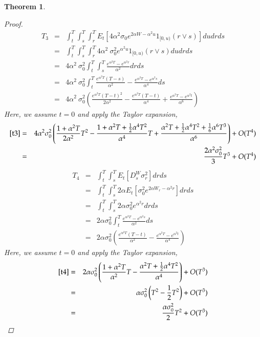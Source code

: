 \documentclass[11pt]{article}
\newtheorem{theorem}{Theorem}
\begin{document}
\begin{theorem}
\begin{proof}
\begin{eqnarray}
T_3 
&=& \int_{t}^{T} \int_{s}^{T}\int_{r}^{T} E_{t}\left[ 4 \alpha^2\sigma_0 e^{2\alpha W - \alpha^2 u}1_{[0,u)}(r \vee s)\right]du dr ds\nonumber\\
&=& \int_{t}^{T} \int_{s}^{T}\int_{r}^{T} 4 \alpha^2\ \sigma_0^2 e^{\alpha^2 u}1_{[0,u)}(r \vee s)du dr ds\nonumber\\
&=& 4 \alpha^2\ \sigma_0^2 \int_{t}^{T} \int_{s}^{T} \frac{e^{\alpha^2 T} - e^{\alpha^2 r}}{\alpha^2} dr ds\nonumber\\
&=& 4 \alpha^2\ \sigma_0^2 \int_{t}^{T} \frac{e^{\alpha^2 T}(T-s)}{\alpha^2} - \frac{e^{\alpha^2 T} - e^{\alpha^2 s}}{\alpha^4} ds\nonumber\\
&=& 4 \alpha^2\ \sigma_0^2 \left( \frac{e^{\alpha^2 T}(T-t)^2}{2\alpha^2} - \frac{e^{\alpha^2 T}(T-t)}{\alpha^4} + \frac{e^{\alpha^2 T} - e^{\alpha^2 t}}{\alpha^6} \right)\label{t3}
\end{eqnarray}
Here, we assume $t=0$ and apply the Taylor expansion,
\begin{eqnarray}
\eqref{t3}
&=& 
4\alpha^2 \sigma_0^2  \left(\frac{1+\alpha^2T}{2\alpha^2}T^2 - \frac{1+\alpha^2T + \frac{1}{2}\alpha^4T^2}{\alpha^4}T + \frac{\alpha^2T + \frac{1}{2}\alpha^4T^2 + \frac{1}{6}\alpha^6T^3}{\alpha^6}\right)+O(T^4)\nonumber\\
&=& 
\frac{2 \alpha^2\sigma_0^2}{3}T^3+O(T^4)
\end{eqnarray}
\begin{eqnarray}
T_4
&=& 
\int_{t}^{T}\int_{s}^{T}E_{t}\left[D_{s}^{W}\sigma _{r}^{2}\right] dr ds \nonumber\\
&=&
\int_{t}^{T}\int_{s}^{T}2\alpha E_{t}\left[ \sigma_0^2 e^{2\alpha W_r - \alpha^2 r}\right] dr ds \nonumber\\
&=&
\int_{t}^{T}\int_{s}^{T}2\alpha \sigma_0^2 e^{\alpha^2 r} dr ds \nonumber\\
&=&
2\alpha \sigma_0^2 \int_{t}^{T} \frac{e^{\alpha^2 T} - e^{\alpha^2 s}}{\alpha^2} ds \nonumber\\
&=&
2\alpha \sigma_0^2  \left(\frac{e^{\alpha^2 T}(T-t)}{\alpha^2} - \frac{e^{\alpha^2 T} - e^{\alpha^2 t}}{\alpha^4} \right)\label{t4}
\end{eqnarray}
Here, we assume $t=0$ and apply the Taylor expansion,
\begin{eqnarray}
\eqref{t4}
&=& 
2\alpha \sigma_0^2  \left(\frac{1+\alpha^2 T}{\alpha^2}T - \frac{\alpha^2T + \frac{1}{2}\alpha^4 T^2}{\alpha^4}\right) + O(T^3)\nonumber\\
&=& 
\alpha \sigma_0^2  \left(T^2 - \frac{1}{2}T^2\right) + O(T^3)\nonumber\\
&=& 
\frac{\alpha \sigma_0^2}{2}T^2+O(T^3)
\end{eqnarray}


\end{proof}
\end{theorem}
\end{document}
